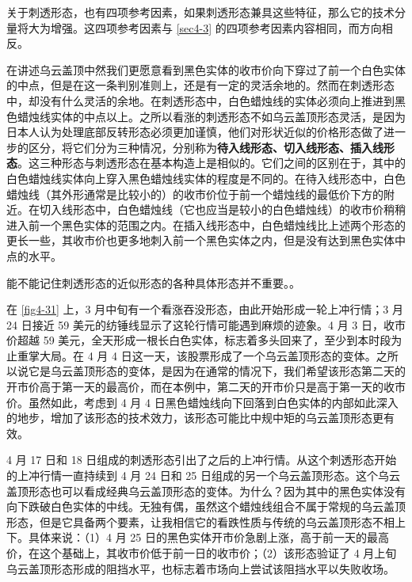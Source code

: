 关于刺透形态，也有四项参考因素，如果刺透形态兼具这些特征，那么它的技术分量将大为增强。这四项参考因素与 \autoref{sec4-3}  的四项参考因素内容相同，而方向相反。

在讲述乌云盖顶中然我们更愿意看到黑色实体的收市价向下穿过了前一个白色实体的中点，但是在这一条判别准则上，还是有一定的灵活余地的。然而在刺透形态中，却没有什么灵活的余地。在刺透形态中，白色蜡烛线的实体必须向上推进到黑色蜡烛线实体的中点以上。之所以看涨的刺透形态不如乌云盖顶形态灵活，是因为日本人认为处理底部反转形态必须更加谨慎，他们对形状近似的价格形态做了进一步的区分，将它们分为三种情况，分别称为\textbf{待入线形态、切入线形态、插入线形态}。这三种形态与刺透形态在基本构造上是相似的。它们之间的区别在于，其中的白色蜡烛线实体向上穿入黑色蜡烛线实体的程度是不同的。在待入线形态中，白色蜡烛线（其外形通常是比较小的）的收市价位于前一个蜡烛线的最低价下方的附近。在切入线形态中，白色蜡烛线（它也应当是较小的白色蜡烛线）的收市价稍稍进入前一个黑色实体的范围之内。在插入线形态中，白色蜡烛线比上述两个形态的更长一些，其收市价也更多地刺入前一个黑色实体之内，但是没有达到黑色实体中点的水平。

能不能记住刺透形态的近似形态的各种具体形态并不重要。。


在 \autoref{fig4-31} 上，3 月中旬有一个看涨吞没形态，由此开始形成一轮上冲行情；3 月 24 日接近 59 美元的纺锤线显示了这轮行情可能遇到麻烦的迹象。4 月 3 日，收市价超越 59 美元，全天形成一根长白色实体，标志着多头回来了，至少到本时段为止重掌大局。在 4 月 4 日这一天，该股票形成了一个乌云盖顶形态的变体。之所以说它是乌云盖顶形态的变体，是因为在通常的情况下，我们希望该形态第二天的开市价高于第一天的最高价，而在本例中，第二天的开市价只是高于第一天的收市价。虽然如此，考虑到 4 月 4 日黑色蜡烛线向下回落到白色实体的内部如此深入的地步，增加了该形态的技术效力，该形态可能比中规中矩的乌云盖顶形态更有效。

4 月 17 日和 18 日组成的刺透形态引出了之后的上冲行情。从这个刺透形态开始的上冲行情一直持续到 4 月 24 日和 25 日组成的另一个乌云盖顶形态。这个乌云盖顶形态也可以看成经典乌云盖顶形态的变体。为什么？因为其中的黑色实体没有向下跌破白色实体的中线。无独有偶，虽然这个蜡烛线组合不属于常规的乌云盖顶形态，但是它具备两个要素，让我相信它的看跌性质与传统的乌云盖顶形态不相上下。具体来说：（1）4 月 25 日的黑色实体开市价急剧上涨，高于前一天的最高价，在这个基础上，其收市价低于前一日的收市价；（2）该形态验证了 4 月上旬乌云盖顶形态形成的阻挡水平，也标志着市场向上尝试该阻挡水平以失败收场。

